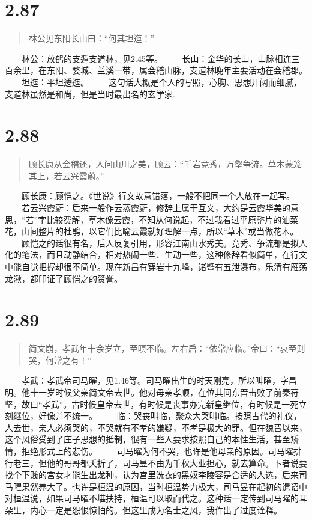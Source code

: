 \documentclass[]{book}
\begin{document}
\section{2.87}\label{section-133}

\begin{quote}
林公见东阳长山曰：``何其坦迤！''
\end{quote}

　　林公：放鹤的支遁支道林，见2.45等。
　　长山：金华的长山，山脉相连三百余里，在东阳、婺城、兰溪一带，属会稽山脉，支道林晚年主要活动在会稽郡。
　　坦迤：平坦逶迤。
　　这句话大概是个人的写照，心胸、思想开阔而细腻，支道林虽然是和尚，但是当时最出名的玄学家.

\section{2.88}\label{section-134}

\begin{quote}
顾长康从会稽还，人问山川之美，顾云：``千岩竞秀，万壑争流。草木蒙笼其上，若云兴霞蔚。''
\end{quote}

　　顾长康：顾恺之。《世说》行文故意错落，一般不把同一个人放在一起写。
　　若云兴霞蔚：后来一般作云蒸霞蔚，修辞上属于互文，大约是云霞华美的意思，``若''字比较费解，草木像云霞，不知从何说起，不过我看过平原整片的油菜花，山间整片的杜鹃，以它们比喻云霞就好理解一点，所以``草木''或当做花木。
　　顾恺之的话很有名，后人反复引用，形容江南山水秀美。竞秀、争流都是拟人化的笔法，而且动静结合，相对热闹一些、生动一些，这种修辞看似简单，在行文中能自觉把握却很不简单。现在新昌有穿岩十九峰，诸暨有五泄瀑布，乐清有雁荡龙湫，都印证了顾恺之的赞誉。

\section{2.89}\label{section-135}

\begin{quote}
简文崩，孝武年十余岁立，至瞑不临。左右启：``依常应临。''帝曰：``哀至则哭，何常之有！''
\end{quote}

　　孝武：孝武帝司马曜，见1.46等。司马曜出生的时天刚亮，所以叫曜，字昌明。他十一岁时候父亲简文帝去世。他对母亲孝顺，在位其间东晋击败了前秦苻坚，故曰``孝武''。古时候皇帝去世，有时候是丧事办完新皇继位，有时候是一死立刻继位，好像并不统一。
　　临：哭丧叫临，聚众大哭叫临。按照古代的礼仪，人去世，亲人必须哭的，不哭就有不孝的嫌疑，不孝是极大的罪。但在魏晋以来，这个风俗受到了庄子思想的抵制，很有一些人要求按照自己的本性生活，甚至矫情，拒绝形式上的悲伤。
　　司马曜为何不哭，也许是他母亲的原因。司马曜排行老三，但他的哥哥都夭折了，司马昱不由为千秋大业担心，就去算命。卜者说要找个下贱的宫女才能生出龙种，认为宫里洗衣的黑奴李陵容是合适的人选，后来司马曜果然养大了。也许是桓温的原因，当时桓温势力极大，司马昱在起初的遗诏中对桓温说，如果司马曜不堪扶持，桓温可以取而代之。这种话一定传到司马曜的耳朵里，内心一定是怨恨惊怕的。但这里成为名士之风，我作出了过度诠释。
\end{document}
